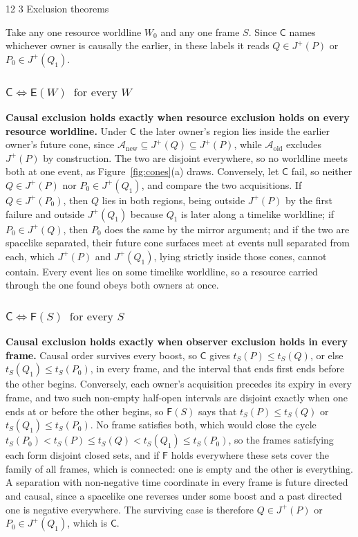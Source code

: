\documentclass[final,5p,times,twocolumn,number]{elsarticle}
\makeatletter
\newcommand{\figref}[1]{Figure~\ref*{#1}}
\renewcommand\subsection{\@startsection{subsection}{2}{\z@}%
           {12\p@ \@plus 6\p@ \@minus 3\p@}%
           {3\p@ \@plus 6\p@ \@minus 3\p@}%
           {\normalfont\normalsize\bfseries}}
\makeatother
\begin{document}
\subsection{Exclusion theorems}

Take any one resource worldline $W_0$ and any one frame $S$.  Since $\mathsf{C}$ names whichever owner is causally the earlier, in these labels it reads $Q \in J^+(P)$ or $P_0 \in J^+(Q_1)$.

\subsubsection{$\mathsf{C} \Leftrightarrow \mathsf{E}(W) \ \text{ for every } W$}
\textbf{Causal exclusion holds exactly when resource exclusion holds on every resource worldline.}  Under $\mathsf{C}$ the later owner's region lies inside the earlier owner's future cone, since $\mathcal{A}_{\mathrm{new}} \subseteq J^+(Q) \subseteq J^+(P)$, while $\mathcal{A}_{\mathrm{old}}$ excludes $J^+(P)$ by construction.  The two are disjoint everywhere, so no worldline meets both at one event, as \figref{fig:cones}(a) draws.  Conversely, let $\mathsf{C}$ fail, so neither $Q \in J^+(P)$ nor $P_0 \in J^+(Q_1)$, and compare the two acquisitions.  If $Q \in J^+(P_0)$, then $Q$ lies in both regions, being outside $J^+(P)$ by the first failure and outside $J^+(Q_1)$ because $Q_1$ is later along a timelike worldline; if $P_0 \in J^+(Q)$, then $P_0$ does the same by the mirror argument; and if the two are spacelike separated, their future cone surfaces meet at events null separated from each, which $J^+(P)$ and $J^+(Q_1)$, lying strictly inside those cones, cannot contain.  Every event lies on some timelike worldline, so a resource carried through the one found obeys both owners at once.

\subsubsection{$\mathsf{C} \Leftrightarrow \mathsf{F}(S) \ \text{ for every } S$}
\textbf{Causal exclusion holds exactly when observer exclusion holds in every frame.}  Causal order survives every boost, so $\mathsf{C}$ gives $t_S(P) \leq t_S(Q)$, or else $t_S(Q_1) \leq t_S(P_0)$, in every frame, and the interval that ends first ends before the other begins.  Conversely, each owner's acquisition precedes its expiry in every frame, and two such non-empty half-open intervals are disjoint exactly when one ends at or before the other begins, so $\mathsf{F}(S)$ says that $t_S(P) \leq t_S(Q)$ or $t_S(Q_1) \leq t_S(P_0)$.  No frame satisfies both, which would close the cycle $t_S(P_0) < t_S(P) \leq t_S(Q) < t_S(Q_1) \leq t_S(P_0)$, so the frames satisfying each form disjoint closed sets, and if $\mathsf{F}$ holds everywhere these sets cover the family of all frames, which is connected: one is empty and the other is everything.  A separation with non-negative time coordinate in every frame is future directed and causal, since a spacelike one reverses under some boost and a past directed one is negative everywhere.  The surviving case is therefore $Q \in J^+(P)$ or $P_0 \in J^+(Q_1)$, which is $\mathsf{C}$.
\end{document}
